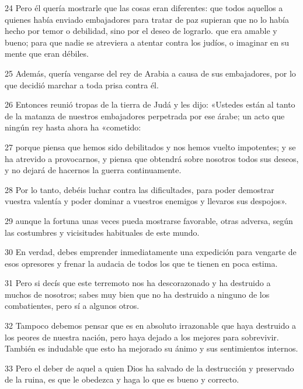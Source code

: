 \par 24 Pero él quería mostrarle que las cosas eran diferentes: que todos aquellos a quienes había enviado embajadores para tratar de paz supieran que no lo había hecho por temor o debilidad, sino por el deseo de lograrlo. que era amable y bueno; para que nadie se atreviera a atentar contra los judíos, o imaginar en su mente que eran débiles.

\par 25 Además, quería vengarse del rey de Arabia a causa de sus embajadores, por lo que decidió marchar a toda prisa contra él.

\par 26 Entonces reunió tropas de la tierra de Judá y les dijo: «Ustedes están al tanto de la matanza de nuestros embajadores perpetrada por ese árabe; un acto que ningún rey hasta ahora ha «cometido:

\par 27 porque piensa que hemos sido debilitados y nos hemos vuelto impotentes; y se ha atrevido a provocarnos, y piensa que obtendrá sobre nosotros todos sus deseos, y no dejará de hacernos la guerra continuamente.

\par 28 Por lo tanto, debéis luchar contra las dificultades, para poder demostrar vuestra valentía y poder dominar a vuestros enemigos y llevaros sus despojos».

\par 29 aunque la fortuna unas veces pueda mostrarse favorable, otras adversa, según las costumbres y vicisitudes habituales de este mundo.

\par 30 En verdad, debes emprender inmediatamente una expedición para vengarte de esos opresores y frenar la audacia de todos los que te tienen en poca estima.

\par 31 Pero si decís que este terremoto nos ha descorazonado y ha destruido a muchos de nosotros; sabes muy bien que no ha destruido a ninguno de los combatientes, pero sí a algunos otros.

\par 32 Tampoco debemos pensar que es en absoluto irrazonable que haya destruido a los peores de nuestra nación, pero haya dejado a los mejores para sobrevivir. También es indudable que esto ha mejorado su ánimo y sus sentimientos internos.

\par 33 Pero el deber de aquel a quien Dios ha salvado de la destrucción y preservado de la ruina, es que le obedezca y haga lo que es bueno y correcto.

